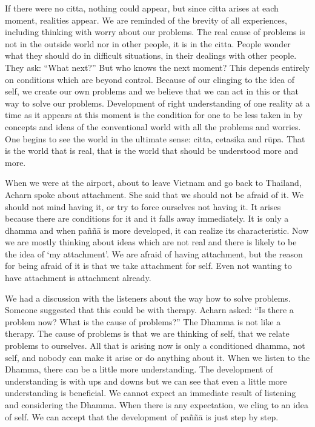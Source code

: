 If there were no citta, nothing could appear, but since citta arises at each moment, realities appear. We are reminded of the brevity of all experiences, including thinking with worry about our problems. The real cause of problems is 
not in the outside world nor in other people, it is in the citta. People wonder 
what they should do in difficult situations, in their dealings with other people. 
They ask: ``What next?'' But who knows the next moment? This depends entirely on conditions which are beyond control. Because of our clinging to the idea 
of self, we create our own problems and we believe that we can act in this or 
that way to solve our problems. Development of right understanding of one reality at a time as it appears at this moment is the condition for one to be less 
taken in by concepts and ideas of the conventional world with all the problems 
and worries. One begins to see the world in the ultimate sense: citta, cetasika 
and rūpa. That is the world that is real, that is the world that should be understood more and more. 

When we were at the airport, about to leave Vietnam and go back to Thailand, 
Acharn spoke about attachment. She said that we should not be afraid of it. We 
should not mind having it, or try to force ourselves not having it. It arises because there are conditions for it and it falls away immediately. It is only a 
dhamma and when paññā is more developed, it can realize its characteristic. 
Now we are mostly thinking about ideas which are not real and there is likely to 
be the idea of `my attachment'. We are afraid of having attachment, but the reason for being afraid of it is that we take attachment for self. Even not wanting to 
have attachment is attachment already. 

We had a discussion with the listeners about the way how to solve problems. 
Someone suggested that this could be with therapy. Acharn asked: ``Is there a 
problem now? What is the cause of problems?'' The Dhamma is not like a therapy. The cause of problems is that we are thinking of self, that we relate problems to ourselves. All that is arising now is only a conditioned dhamma, not 
self, and nobody can make it arise or do anything about it. When we listen to the 
Dhamma, there can be a little more understanding. The development of understanding is with ups and downs but we can see that even a little more understanding is beneficial. We cannot expect an immediate result of listening and 
considering the Dhamma. When there is any expectation, we cling to an idea of 
self. We can accept that the development of paññā is just step by step. 

